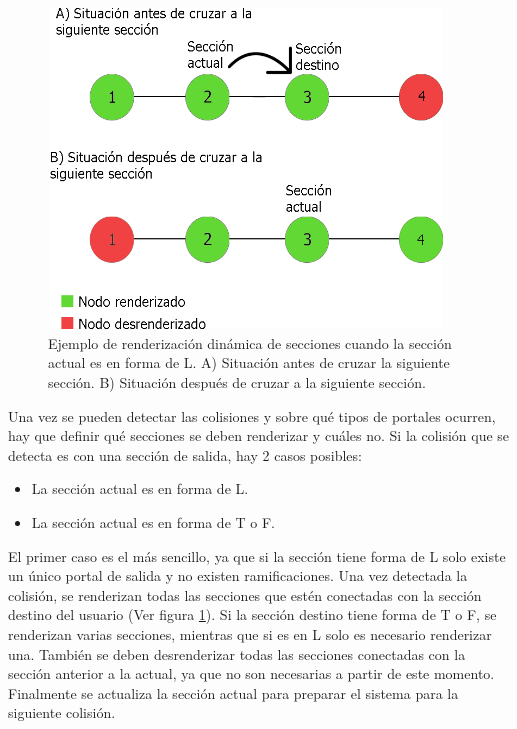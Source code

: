 \documentclass[../main.tex]{subfiles}
\begin{document}
\begin{figure}[h!]
\centering
\includegraphics[width=10.5cm,height=8.5cm]{imagenes/Simple_Node_Render_Case.png}
\caption{Ejemplo de renderización dinámica de secciones cuando la sección actual es en forma de L. A) Situación antes de cruzar la siguiente sección. B) Situación después de cruzar a la siguiente sección.}
\label{fig:Simple_Node_Render_Case}
\end{figure}

Una vez se pueden detectar las colisiones y sobre qué tipos de portales ocurren, hay que definir qué secciones se deben renderizar y cuáles no. Si la colisión que se detecta es con una sección de salida, hay 2 casos posibles:

\begin{itemize}
    \item La sección actual es en forma de L.
    \item La sección actual es en forma de T o F.
\end{itemize}

El primer caso es el más sencillo, ya que si la sección tiene forma de L solo existe un único portal de salida y no existen ramificaciones. Una vez detectada la colisión, se renderizan todas las secciones que estén conectadas con la sección destino del usuario (Ver figura \ref{fig:Simple_Node_Render_Case}). Si la sección destino tiene forma de T o F, se renderizan varias secciones, mientras que si es en L solo es necesario renderizar una. También se  deben desrenderizar todas las secciones conectadas con la sección anterior a la actual, ya que no son necesarias a partir de este momento. Finalmente se actualiza la sección actual para preparar el sistema para la siguiente colisión.
\end{document}
